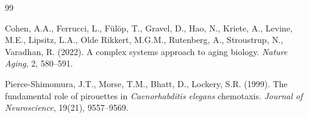 \documentclass[12pt]{article}
\begin{document}
\begin{thebibliography}{99}

Cohen, A.A., Ferrucci, L., F\"ul\"op, T., Gravel, D., Hao, N., Kriete, A., Levine, M.E., Lipsitz, L.A., Olde Rikkert, M.G.M., Rutenberg, A., Stroustrup, N., Varadhan, R. (2022). A complex systems approach to aging biology. \textit{Nature Aging}, 2, 580--591.


Pierce-Shimomura, J.T., Morse, T.M., Bhatt, D., Lockery, S.R. (1999). The fundamental role of pirouettes in \textit{Caenorhabditis elegans} chemotaxis. \textit{Journal of Neuroscience}, 19(21), 9557--9569.

\end{thebibliography}
\end{document}
